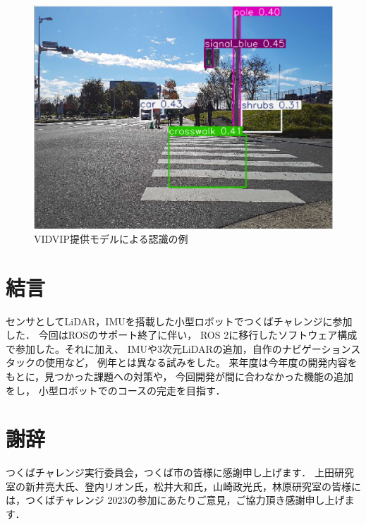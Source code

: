 \documentclass[twocolumn,9pt]{jsproceedings}
\begin{document}
\begin{figure}[h]
  \begin{center}
    \includegraphics[width=0.6\linewidth]{figs/result_of_yolo.pdf}
    \caption{VIDVIP提供モデルによる認識の例}
    \label{fig:result_yolo}
  \end{center}
\end{figure}

\section{結言}
センサとしてLiDAR，IMUを搭載した小型ロボットでつくばチャレンジに参加した．
今回はROSのサポート終了に伴い，
ROS 2に移行したソフトウェア構成で参加した。それに加え、
IMUや3次元LiDARの追加，自作のナビゲーションスタックの使用など，
例年とは異なる試みをした。
来年度は今年度の開発内容をもとに，見つかった課題への対策や，
今回開発が間に合わなかった機能の追加をし，
小型ロボットでのコースの完走を目指す．


\section*{謝辞}
つくばチャレンジ実行委員会，つくば市の皆様に感謝申し上げます．
上田研究室の新井亮大氏、登内リオン氏，松井大和氏，山崎政光氏，林原研究室の皆様には，つくばチャレンジ 2023の参加にあたりご意見，ご協力頂き感謝申し上げます．
\end{document}
